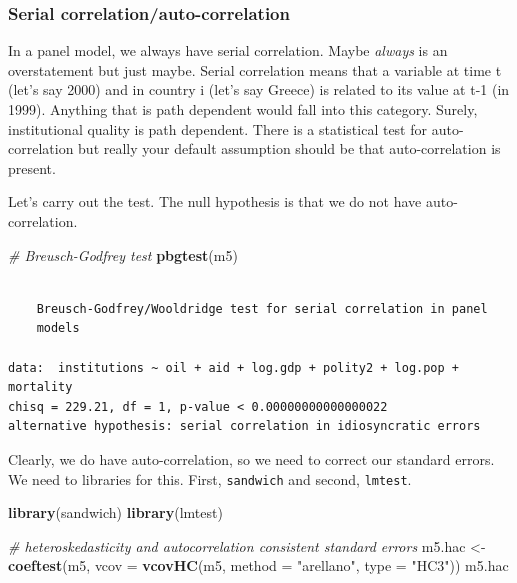 \documentclass[]{article}
\newenvironment{Shaded}{\begin{snugshade}}{\end{snugshade}}
\newcommand{\KeywordTok}[1]{\textcolor[rgb]{0.13,0.29,0.53}{\textbf{#1}}}
\newcommand{\DataTypeTok}[1]{\textcolor[rgb]{0.13,0.29,0.53}{#1}}
\newcommand{\StringTok}[1]{\textcolor[rgb]{0.31,0.60,0.02}{#1}}
\newcommand{\CommentTok}[1]{\textcolor[rgb]{0.56,0.35,0.01}{\textit{#1}}}
\newcommand{\NormalTok}[1]{#1}
\theoremstyle{definition}
\theoremstyle{definition}
\theoremstyle{definition}
\theoremstyle{remark}
\begin{document}
\subsubsection{Serial
correlation/auto-correlation}\label{serial-correlationauto-correlation}

In a panel model, we always have serial correlation. Maybe \emph{always}
is an overstatement but just maybe. Serial correlation means that a
variable at time t (let's say 2000) and in country i (let's say Greece)
is related to its value at t-1 (in 1999). Anything that is path
dependent would fall into this category. Surely, institutional quality
is path dependent. There is a statistical test for auto-correlation but
really your default assumption should be that auto-correlation is
present.

Let's carry out the test. The null hypothesis is that we do not have
auto-correlation.

\begin{Shaded}
\begin{Highlighting}[]
\CommentTok{# Breusch-Godfrey test}
\KeywordTok{pbgtest}\NormalTok{(m5)}
\end{Highlighting}
\end{Shaded}

\begin{verbatim}

    Breusch-Godfrey/Wooldridge test for serial correlation in panel
    models

data:  institutions ~ oil + aid + log.gdp + polity2 + log.pop + mortality
chisq = 229.21, df = 1, p-value < 0.00000000000000022
alternative hypothesis: serial correlation in idiosyncratic errors
\end{verbatim}

Clearly, we do have auto-correlation, so we need to correct our standard
errors. We need to libraries for this. First, \texttt{sandwich} and
second, \texttt{lmtest}.

\begin{Shaded}
\begin{Highlighting}[]
\KeywordTok{library}\NormalTok{(sandwich)}
\KeywordTok{library}\NormalTok{(lmtest)}

\CommentTok{# heteroskedasticity and autocorrelation consistent standard errors}
\NormalTok{m5.hac <-}\StringTok{ }\KeywordTok{coeftest}\NormalTok{(m5, }\DataTypeTok{vcov =} \KeywordTok{vcovHC}\NormalTok{(m5, }\DataTypeTok{method =} \StringTok{"arellano"}\NormalTok{, }\DataTypeTok{type =} \StringTok{"HC3"}\NormalTok{))}
\NormalTok{m5.hac}
\end{Highlighting}
\end{Shaded}
\end{document}
